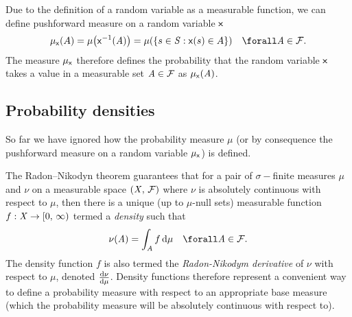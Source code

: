Due to the definition of a random variable as a measurable function, we can define pushforward measure on a random variable $\mathsf{x}$
\begin{equation}
  \mu_{\rvar{x}}(A) 
  = \mu\lpa\rvar{x}^{-1}(\set{A})\rpa
  = \mu\lpa \lbr s \in \set{S}: \rvar{x}(s) \in A \rbr \rpa
  \quad \forall \set{A} \in \sset{F}.
\end{equation}
The measure $\mu_{\mathsf{x}}$ therefore defines the probability that the random variable $\mathsf{x}$ takes a value in a measurable set $\mathit{A} \in \mathcal{F}$ as $\mu_{\mathsf{x}}(\mathit{A})$.


\subsection{Probability densities}

So far we have ignored how the probability measure $\mu$ (or by consequence the pushforward measure on a random variable $\mu_{\mathsf{x}}$) is defined. 

The Radon--Nikodyn theorem \citep{} guarantees that for a pair of $\sigma-$finite measures $\mu$ and $\nu$ on a measurable space $(\mathit{X},\,\mathcal{F})$ where $\nu$ is absolutely continuous with respect to $\mu$,  then there is a unique (up to $\mu$-null sets) measurable function $f : \mathit{X} \to [0,\,\infty)$ termed a \emph{density} such that
\begin{equation}
  \nu(\set{A}) = \int_{\set{A}} f\,\dr\mu
  \quad \forall \set{A} \in \sset{F}.
\end{equation}
The density function $f$ is also termed the \emph{Radon-Nikodym derivative} of $\nu$ with respect to $\mu$, denoted $\frac{\mathrm{d} \nu}{\mathrm{d} \mu}$. Density functions therefore represent a convenient way to define a probability measure with respect to an appropriate base measure (which the probability measure will be absolutely continuous with respect to).

